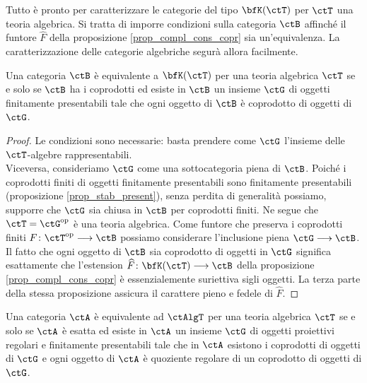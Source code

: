Tutto è pronto per caratterizzare le categorie del tipo \(\bfK(\ctT)\) per \(\ctT\) una teoria algebrica. Si tratta di imporre condizioni
sulla categoria \(\ctB\) affinché il funtore \(\widehat{F}\) della proposizione \ref{prop_compl_cons_copr} sia un'equivalenza.
La caratterizzazione delle categorie algebriche segurà allora facilmente.

\begin{corollary}\label{cor_caratt_KT}
 Una categoria \(\ctB\) è equivalente a \(\bfK(\ctT)\) per una teoria algebrica \(\ctT\) se e solo se \(\ctB\) ha i coprodotti ed esiste in
 \(\ctB\) un insieme \(\ctG\) di oggetti finitamente presentabili tale che ogni oggetto di \(\ctB\) è coprodotto di oggetti di \(\ctG\).
\end{corollary}

\begin{proof}
 Le condizioni sono necessarie: basta prendere come \(\ctG\) l'insieme delle \(\ctT\)-algebre rappresentabili. \\
 Viceversa, consideriamo \(\ctG\) come una sottocategoria piena di \(\ctB\). Poiché i coprodotti finiti di oggetti finitamente presentabili
 sono finitamente presentabili (proposizione \ref{prop_stab_present}), senza perdita di generalità possiamo, supporre che \(\ctG\)
 sia chiusa in \(\ctB\) per coprodotti finiti. Ne segue che \(\ctT = \ctG^{\op}\) è una teoria algebrica. Come funtore che preserva i
 coprodotti finiti \(F \colon \ctT^{\op} \fun \ctB\) possiamo considerare l'inclusione piena \(\ctG \fun \ctB\). Il fatto che ogni oggetto di
 \(\ctB\) sia coprodotto di oggetti in \(\ctG\) significa esattamente che l'estension \(\widehat{F} \colon \bfK(\ctT) \fun \ctB\) della
 proposizione \ref{prop_compl_cons_copr} è essenzialemente suriettiva sigli oggetti. La terza parte della stessa proposizione
 assicura il carattere pieno e fedele di \(\widehat{F}\).
\end{proof}

\begin{corollary}\label{cor_caratt_AlgT}
 Una categoria \(\ctA\) è equivalente ad \(\ctAlgT\) per una teoria algebrica \(\ctT\) se e solo se \(\ctA\) è esatta ed esiste in \(\ctA\)
 un insieme \(\ctG\) di oggetti proiettivi regolari e finitamente presentabili tale che in \(\ctA\) esistono i coprodotti di oggetti di \(\ctG\)
 e ogni oggetto di \(\ctA\) è quoziente regolare di un coprodotto di oggetti di \(\ctG\).
\end{corollary}

